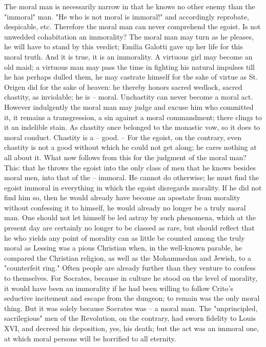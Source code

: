 \documentclass[a4paper]{book}
\begin{document}
The moral man is necessarily narrow in that he knows no other enemy than the 
"{}immoral"{} man. "{}He who is not moral is immoral!"{} and accordingly 
reprobate, despicable, etc. Therefore the moral man can never comprehend the 
egoist. Is not unwedded cohabitation an immorality? The moral man may turn as 
he pleases, he will have to stand by this verdict; Emilia Galotti gave up her 
life for this moral truth. And it is true, it is an immorality. A virtuous 
girl may become an old maid; a virtuous man may pass the time in fighting his 
natural impulses till he has perhaps dulled them, he may castrate himself for 
the sake of virtue as St. Origen did for the sake of heaven: he thereby honors 
sacred wedlock, sacred chastity, as inviolable; he is -- moral. Unchastity can 
never become a moral act. However indulgently the moral man may judge and 
excuse him who committed it, it remains a transgression, a sin against a moral 
commandment; there clings to it an indelible stain. As chastity once belonged 
to the monastic vow, so it does to moral conduct. Chastity is a -- good. -- 
For the egoist, on the contrary, even chastity is not a good without which he 
could not get along; he cares nothing at all about it. What now follows from 
this for the judgment of the moral man? This: that he throws the egoist into 
the only class of men that he knows besides moral men, into that of the -- 
immoral. He cannot do otherwise; he must find the egoist immoral in everything 
in which the egoist disregards morality. If he did not find him so, then he 
would already have become an apostate from morality without confessing it to 
himself, he would already no longer be a truly moral man. One should not let 
himself be led astray by such phenomena, which at the present day are 
certainly no longer to be classed as rare, but should reflect that he who 
yields any point of morality can as little be counted among the truly moral as 
Lessing was a pious Christian when, in the well-known parable, he compared the 
Christian religion, as well as the Mohammedan and Jewish, to a "{}counterfeit 
ring."{} Often people are already further than they venture to confess to 
themselves. For Socrates, because in culture he stood on the level of 
morality, it would have been an immorality if he had been willing to follow 
Crito's seductive incitement and escape from the dungeon; to remain was the 
only moral thing. But it was solely because Socrates was -- a moral man. The 
"{}unprincipled, sacrilegious"{} men of the Revolution, on the contrary, had 
sworn fidelity to Louis XVI, and decreed his deposition, yes, his death; but 
the act was an immoral one, at which moral persons will be horrified to all 
eternity.
\end{document}
